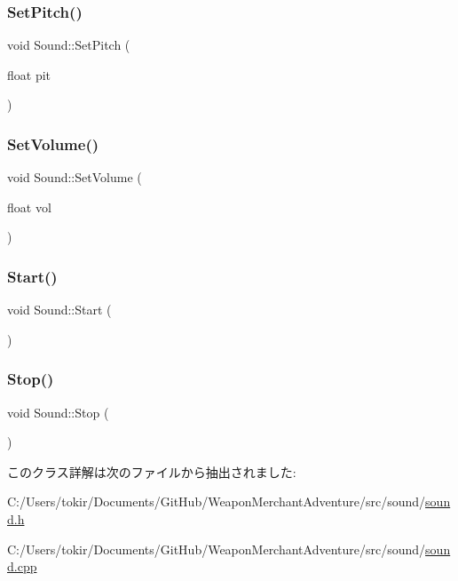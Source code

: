 \subsubsection{\texorpdfstring{Set\+Pitch()}{SetPitch()}}
{\footnotesize\ttfamily void Sound\+::\+Set\+Pitch (\begin{DoxyParamCaption}\item[{float}]{pit }\end{DoxyParamCaption})\hspace{0.3cm}{\ttfamily [inline]}}

\mbox{\label{class_sound_a993eee69f61611ca1b4621ea0952e2c8}} 
\subsubsection{\texorpdfstring{Set\+Volume()}{SetVolume()}}
{\footnotesize\ttfamily void Sound\+::\+Set\+Volume (\begin{DoxyParamCaption}\item[{float}]{vol }\end{DoxyParamCaption})\hspace{0.3cm}{\ttfamily [inline]}}

\mbox{\label{class_sound_ae021b518e93d7d8c6f3ea951cd4b98d8}} 
\subsubsection{\texorpdfstring{Start()}{Start()}}
{\footnotesize\ttfamily void Sound\+::\+Start (\begin{DoxyParamCaption}{ }\end{DoxyParamCaption})\hspace{0.3cm}{\ttfamily [inline]}}

\mbox{\label{class_sound_a188de6836d531813da378464e392e813}} 
\subsubsection{\texorpdfstring{Stop()}{Stop()}}
{\footnotesize\ttfamily void Sound\+::\+Stop (\begin{DoxyParamCaption}{ }\end{DoxyParamCaption})\hspace{0.3cm}{\ttfamily [inline]}}



このクラス詳解は次のファイルから抽出されました\+:\begin{DoxyCompactItemize}
\item 
C\+:/\+Users/tokir/\+Documents/\+Git\+Hub/\+Weapon\+Merchant\+Adventure/src/sound/\mbox{\hyperlink{sound_8h}{sound.\+h}}\item 
C\+:/\+Users/tokir/\+Documents/\+Git\+Hub/\+Weapon\+Merchant\+Adventure/src/sound/\mbox{\hyperlink{sound_8cpp}{sound.\+cpp}}\end{DoxyCompactItemize}
